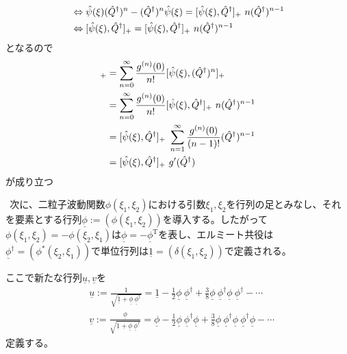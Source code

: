 \documentclass[dvipdfmx, 11pt, a4paper]{jsarticle}
\numberwithin{equation}{section}
\theoremstyle{definition}
\begin{document}
\begin{derivationBox}
\begin{align}
            &\Leftrightarrow \hat{\psi}(\xi)(\hat{Q}^\dagger)^n - (\hat{Q}^\dagger)^n \hat{\psi}(\xi)=  [\hat{\psi}(\xi),\hat{Q}^\dagger]_{+}\ n (\hat{Q}^\dagger)^{n-1} \notag \\ 
            &\Leftrightarrow [\hat{\psi}(\xi),\hat{Q}^\dagger]_{+}=  [\hat{\psi}(\xi),\hat{Q}^\dagger]_{+}\ n (\hat{Q}^\dagger)^{n-1}
        \end{align}
        となるので
        \begin{align}
            [\hat{\psi}(\xi),g(\hat{Q}^\dagger)]_{+} &= \sum_{n=0}^\infty \frac{g^{(n)}(0)}{n!}[\hat{\psi}(\xi),(\hat{Q}^\dagger)^n]_{+} \notag \\
            &= \sum_{n=0}^\infty \frac{g^{(n)}(0)}{n!}[\hat{\psi}(\xi),\hat{Q}^\dagger]_{+}\ n (\hat{Q}^\dagger)^{n-1} \notag \\
            &= [\hat{\psi}(\xi),\hat{Q}^\dagger]_{+}\ \sum_{n=1}^\infty \frac{g^{(n)}(0)}{(n-1)!} (\hat{Q}^\dagger)^{n-1} \notag \\
            &=[\hat{\psi}(\xi),\hat{Q}^\dagger]_{+}\  g'(\hat{Q}^\dagger)
        \end{align}
        が成り立つ
    \end{derivationBox}
    $\ \ $次に、二粒子波動関数$\phi(\xi_1,\xi_2)$における引数$\xi_1,\xi_2$を行列の足とみなし、それを要素とする行列$\underline{\phi}:=(\phi(\xi_1,\xi_2))$を導入する。したがって$\phi(\xi_1,\xi_2) = -\phi(\xi_2,\xi_1)$は$\underline{\phi}=-\underline{\phi}^\mathrm{T}$を表し、エルミート共役は$\underline{\phi}^\dagger = (\phi^*(\xi_2,\xi_1))$で単位行列は$\underline{1}=(\delta(\xi_1,\xi_2))$で定義される。
    \begin{definition}[]
        ここで新たな行列$\underline{u},\underline{v}$を
        \begin{align}
            &\underline{u} := \frac{1}{\sqrt{\underline{1} + \underline{\phi}\ \underline{\phi}^\dagger}} = \underline{1} -\frac{1}{2} \underline{\phi}\ \underline{\phi}^\dagger + \frac{3}{8} \underline{\phi}\ \underline{\phi}^\dagger \underline{\phi}\ \underline{\phi}^\dagger - \cdots \\
            &\underline{v} := \frac{\underline{\phi}}{\sqrt{\underline{1} + \underline{\phi}\ \underline{\phi}^\dagger}} = \underline{\phi} -\frac{1}{2} \underline{\phi}\ \underline{\phi}^\dagger \underline{\phi} + \frac{3}{8} \underline{\phi}\ \underline{\phi}^\dagger \underline{\phi}\ \underline{\phi}^\dagger \underline{\phi}- \cdots
        \end{align}
        定義する。
    \end{definition}
\end{document}

